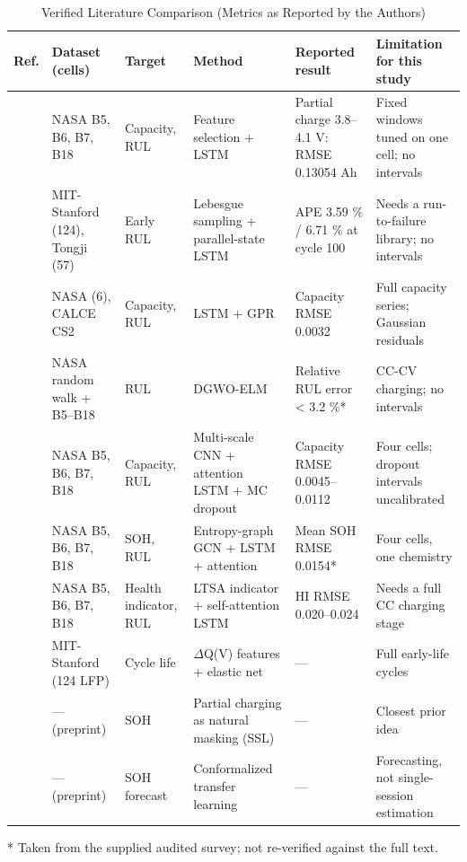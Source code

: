 \documentclass[journal]{IEEEtran}
\begin{document}
\begin{table}[!t]
\centering
\caption{Verified Literature Comparison (Metrics as Reported by the Authors)}
\label{tab:1}
\scriptsize
\begin{tabularx}{\textwidth}{@{}>{\raggedright\arraybackslash}X>{\raggedright\arraybackslash}X>{\raggedright\arraybackslash}X>{\raggedright\arraybackslash}X>{\raggedright\arraybackslash}X>{\raggedright\arraybackslash}X@{}}
\toprule
Ref. & Dataset (cells) & Target & Method & Reported result & Limitation for this study \\
\midrule
\cite{b1} & NASA B5, B6, B7, B18 & Capacity, RUL & Feature selection + LSTM & Partial charge 3.8--4.1 V: RMSE 0.13054 Ah & Fixed windows tuned on one cell; no intervals \\
\cite{b2} & MIT-Stanford (124), Tongji (57) & Early RUL & Lebesgue sampling + parallel-state LSTM & APE 3.59 \% / 6.71 \% at cycle 100 & Needs a run-to-failure library; no intervals \\
\cite{b3} & NASA (6), CALCE CS2 & Capacity, RUL & LSTM + GPR & Capacity RMSE 0.0032 & Full capacity series; Gaussian residuals \\
\cite{b4} & NASA random walk + B5--B18 & RUL & DGWO-ELM & Relative RUL error \textless{} 3.2 \%* & CC-CV charging; no intervals \\
\cite{b5} & NASA B5, B6, B7, B18 & Capacity, RUL & Multi-scale CNN + attention LSTM + MC dropout & Capacity RMSE 0.0045--0.0112 & Four cells; dropout intervals uncalibrated \\
\cite{b6} & NASA B5, B6, B7, B18 & SOH, RUL & Entropy-graph GCN + LSTM + attention & Mean SOH RMSE 0.0154* & Four cells, one chemistry \\
\cite{b7} & NASA B5, B6, B7, B18 & Health indicator, RUL & LTSA indicator + self-attention LSTM & HI RMSE 0.020--0.024 & Needs a full CC charging stage \\
\cite{b8} & MIT-Stanford (124 LFP) & Cycle life & $\Delta$Q(V) features + elastic net & --- & Full early-life cycles \\
\cite{b20} & --- (preprint) & SOH & Partial charging as natural masking (SSL) & --- & Closest prior idea \\
\cite{b22} & --- (preprint) & SOH forecast & Conformalized transfer learning & --- & Forecasting, not single-session estimation \\
\bottomrule
\end{tabularx}
\end{table}
* Taken from the supplied audited survey; not re-verified against the full text.
\end{document}
